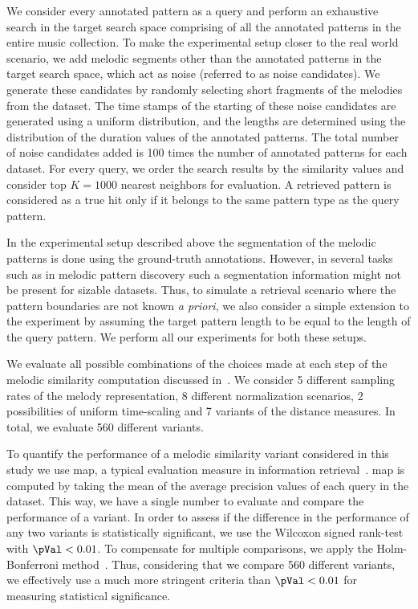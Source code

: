 We consider every annotated pattern as a query and perform an exhaustive search in the target search space comprising of all the annotated patterns in the entire music collection. To make the experimental setup closer to the real world scenario, we add melodic segments other than the annotated patterns in the target search space, which act as noise (referred to as noise candidates). We generate these candidates by randomly selecting short fragments of the melodies from the dataset. The time stamps of the starting of these noise candidates are generated using a uniform distribution, and the lengths are determined using the distribution of the duration values of the annotated patterns. The total number of noise candidates added is 100 times the number of annotated patterns for each dataset. For every query, we order the search results by the similarity values and consider top $K=1000$ nearest neighbors for evaluation. A retrieved pattern is considered as a true hit only if it belongs to the same pattern type as the query pattern. 

In the experimental setup described above the segmentation of the melodic patterns is done using the ground-truth annotations. However, in several tasks such as in melodic pattern discovery such a segmentation information might not be present for sizable datasets. Thus, to simulate a retrieval scenario where the pattern boundaries are not known \textit{a priori}, we also consider a simple extension to the experiment by assuming the target pattern length to be equal to the length of the query pattern. We perform all our experiments for both these setups. 

We evaluate all possible combinations of the choices made at each step of the melodic similarity computation discussed in~. We consider 5 different sampling rates of the melody representation, 8 different normalization scenarios, 2 possibilities of uniform time-scaling and 7 variants of the distance measures. In total, we evaluate 560 different variants.

To quantify the performance of a melodic similarity variant considered in this study we use \acrfull{map}, a typical evaluation measure in information retrieval~\citep{manning2008introduction}. \Gls{map} is computed by taking the mean of the average precision values of each query in the dataset. This way, we have a single number to evaluate and compare the performance of a variant. In order to assess if the difference in the performance of any two variants is statistically significant, we use the Wilcoxon signed rank-test~\citep{wilcoxon1945individual} with $\pVal < 0.01$. To compensate for multiple comparisons, we apply the Holm-Bonferroni method~\citep{holm1979simple}. Thus, considering that we compare 560 different variants, we effectively use a much more stringent criteria than $\pVal < 0.01$ for measuring statistical significance.


